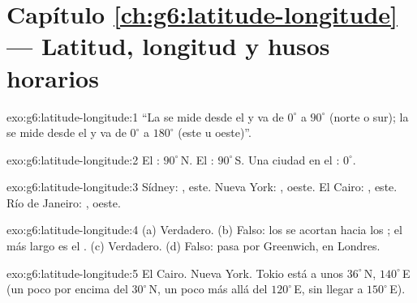 \section*{Capítulo \ref{ch:g6:latitude-longitude} --- Latitud, longitud y husos horarios}

\begin{solution}{exo:g6:latitude-longitude:1}
``La  se mide desde el  y va de $0^\circ$ a $90^\circ$ (norte
o sur); la  se mide desde el  y va de $0^\circ$
a $180^\circ$ (este u oeste)''.
\end{solution}

\begin{solution}{exo:g6:latitude-longitude:2}
El : $90^\circ$\,N. El : $90^\circ$\,S. Una ciudad en el
: $0^\circ$.
\end{solution}

\begin{solution}{exo:g6:latitude-longitude:3}
Sídney: , este. Nueva York: , oeste. El
Cairo: , este. Río de Janeiro: , oeste.
\end{solution}

\begin{solution}{exo:g6:latitude-longitude:4}
(a) Verdadero. (b) Falso: los  se acortan hacia los ; el más
largo es el . (c) Verdadero. (d) Falso: pasa por Greenwich, en
Londres.
\end{solution}

\begin{solution}{exo:g6:latitude-longitude:5}
El Cairo. Nueva York. Tokio está a unos $36^\circ$\,N, $140^\circ$\,E (un
poco por encima del  $30^\circ$\,N, un poco más allá del 
$120^\circ$\,E, sin llegar a $150^\circ$\,E).
\end{solution}

